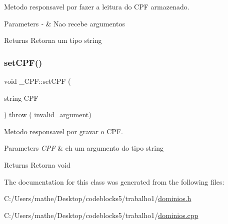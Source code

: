 Metodo responsavel por fazer a leitura do C\+PF armazenado. 


\begin{DoxyParams}{Parameters}
{\em -\/} & Nao recebe argumentos \\
\hline
\end{DoxyParams}
\begin{DoxyReturn}{Returns}
Retorna um tipo string 
\end{DoxyReturn}
\mbox{\label{class___c_p_f_ad113fae4b663b4e393447cd4156249bb}} 
\subsubsection{\texorpdfstring{setCPF()}{setCPF()}}
{\footnotesize\ttfamily void \+\_\+\+C\+P\+F\+::set\+C\+PF (\begin{DoxyParamCaption}\item[{string}]{C\+PF }\end{DoxyParamCaption}) throw ( invalid\+\_\+argument) }



Metodo responsavel por gravar o C\+PF. 


\begin{DoxyParams}{Parameters}
{\em C\+PF} & eh um argumento do tipo string \\
\hline
\end{DoxyParams}
\begin{DoxyReturn}{Returns}
Retorna void 
\end{DoxyReturn}


The documentation for this class was generated from the following files\+:\begin{DoxyCompactItemize}
\item 
C\+:/\+Users/mathe/\+Desktop/codeblocks5/trabalho1/\mbox{\hyperlink{dominios_8h}{dominios.\+h}}\item 
C\+:/\+Users/mathe/\+Desktop/codeblocks5/trabalho1/\mbox{\hyperlink{dominios_8cpp}{dominios.\+cpp}}\end{DoxyCompactItemize}
